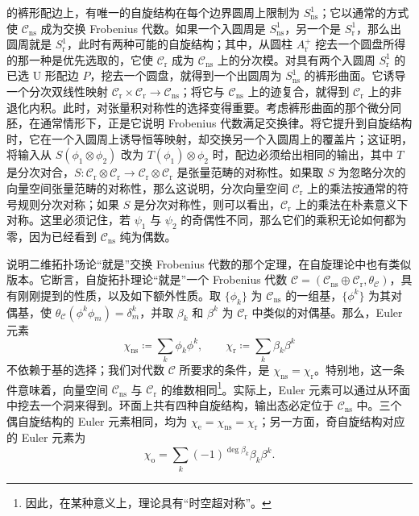 \begin{example}
的裤形配边上，有唯一的自旋结构在每个边界圆周上限制为 $S^1_{\mathrm{ns}}$；它以通常的方式使 $\mathcal{C}_{\mathrm{ns}}$ 成为交换 Frobenius 代数。如果一个入圆周是 $S^1_{\mathrm{ns}}$，另一个是 $S^1_{\mathrm{r}}$，那么出圆周就是 $S^1_{\mathrm{r}}$，此时有两种可能的自旋结构；其中，从圆柱 $A^+_{\mathrm{r}}$ 挖去一个圆盘所得的那一种是优先选取的，它使 $\mathcal{C}_{\mathrm{r}}$ 成为 $\mathcal{C}_{\mathrm{ns}}$ 上的分次模。对具有两个入圆周 $S^1_{\mathrm{r}}$ 的已选 U 形配边 $P$，挖去一个圆盘，就得到一个出圆周为 $S^1_{\mathrm{ns}}$ 的裤形曲面。它诱导一个分次双线性映射 $\mathcal{C}_{\mathrm{r}}\times\mathcal{C}_{\mathrm{r}}\to\mathcal{C}_{\mathrm{ns}}$；将它与 $\mathcal{C}_{\mathrm{ns}}$ 上的迹复合，就得到 $\mathcal{C}_{\mathrm{r}}$ 上的非退化内积。此时，对张量积对称性的选择变得重要。考虑裤形曲面的那个微分同胚，在通常情形下，正是它说明 Frobenius 代数满足交换律。将它提升到自旋结构时，它在一个入圆周上诱导恒等映射，却交换另一个入圆周上的覆盖片；这证明，将输入从 $S(\phi_1\otimes\phi_2)$ 改为 $T(\phi_1)\otimes\phi_2$ 时，配边必须给出相同的输出，其中 $T$ 是分次对合，$S\colon\mathcal{C}_{\mathrm{r}}\otimes\mathcal{C}_{\mathrm{r}}\to\mathcal{C}_{\mathrm{r}}\otimes\mathcal{C}_{\mathrm{r}}$ 是张量范畴的对称性。如果取 $S$ 为忽略分次的向量空间张量范畴的对称性，那么这说明，分次向量空间 $\mathcal{C}_{\mathrm{r}}$ 上的乘法按通常的符号规则分次对称；如果 $S$ 是分次对称性，则可以看出，$\mathcal{C}_{\mathrm{r}}$ 上的乘法在朴素意义下对称。这里必须记住，若 $\psi_1$ 与 $\psi_2$ 的奇偶性不同，那么它们的乘积无论如何都为零，因为已经看到 $\mathcal{C}_{\mathrm{ns}}$ 纯为偶数。

说明二维拓扑场论“就是”交换 Frobenius 代数的那个定理，在自旋理论中也有类似版本。它断言，自旋拓扑理论“就是”一个 Frobenius 代数 $\mathcal{C}=(\mathcal{C}_{\mathrm{ns}}\oplus\mathcal{C}_{\mathrm{r}},\theta_{\mathcal{C}})$，具有刚刚提到的性质，以及如下额外性质。取 $\{\phi_k\}$ 为 $\mathcal{C}_{\mathrm{ns}}$ 的一组基，$\{\phi^k\}$ 为其对偶基，使 $\theta_{\mathcal{C}}(\phi^k\phi_m)=\delta^k_m$，并取 $\beta_k$ 和 $\beta^k$ 为 $\mathcal{C}_{\mathrm{r}}$ 中类似的对偶基。那么，Euler 元素
\[
\chi_{\mathrm{ns}}\coloneqq\sum_k\phi_k\phi^k,\qquad
\chi_{\mathrm{r}}\coloneqq\sum_k\beta_k\beta^k
\]
不依赖于基的选择；我们对代数 $\mathcal{C}$ 所要求的条件，是 $\chi_{\mathrm{ns}}=\chi_{\mathrm{r}}$。特别地，这一条件意味着，向量空间 $\mathcal{C}_{\mathrm{ns}}$ 与 $\mathcal{C}_{\mathrm{r}}$ 的维数相同\footnote{因此，在某种意义上，理论具有“时空超对称”。}。实际上，Euler 元素可以通过从环面中挖去一个洞来得到。环面上共有四种自旋结构，输出态必定位于 $\mathcal{C}_{\mathrm{ns}}$ 中。三个偶自旋结构的 Euler 元素相同，均为 $\chi_{\mathrm{e}}=\chi_{\mathrm{ns}}=\chi_{\mathrm{r}}$；另一方面，奇自旋结构对应的 Euler 元素为
\[
\chi_{\mathrm{o}}=\sum_k(-1)^{\deg\beta_k}\beta_k\beta^k.
\]


\end{example}
